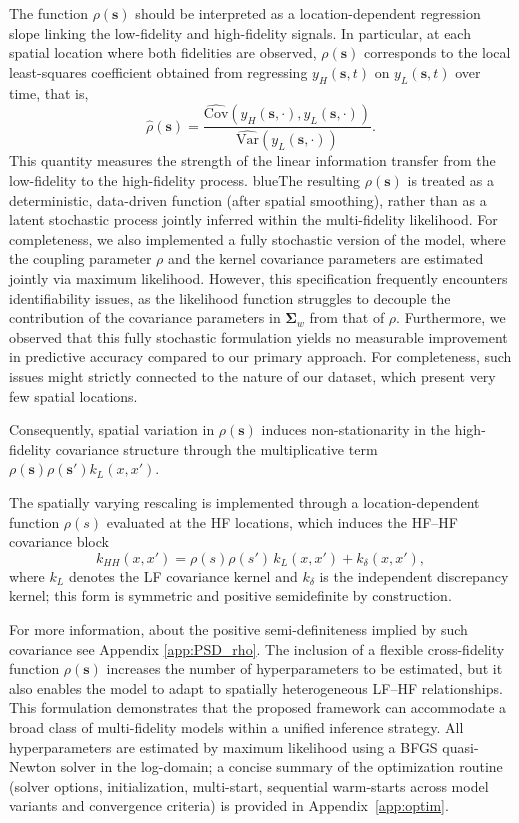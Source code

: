 \documentclass[12pt]{article}
\begin{document}
The function $\rho(\bm{s})$ should be interpreted as a location-dependent
regression slope linking the low-fidelity and high-fidelity signals.
In particular, at each spatial location where both fidelities are observed,
$\rho(\bm{s})$ corresponds to the local least-squares coefficient obtained
from regressing $y_H(\bm{s},t)$ on $y_L(\bm{s},t)$ over time,
that is,
\[
\hat{\rho}(\bm{s}) =
\frac{\widehat{\mathrm{Cov}}\!\left(y_H(\bm{s},\cdot),y_L(\bm{s},\cdot)\right)}
{\widehat{\mathrm{Var}}\!\left(y_L(\bm{s},\cdot)\right)}.
\]
This quantity measures the strength of the linear information transfer
from the low-fidelity to the high-fidelity process.
blueThe resulting $\rho(\bm{s})$ is treated as a deterministic, data-driven
function (after spatial smoothing), rather than as a latent stochastic
process jointly inferred within the multi-fidelity likelihood.  For completeness, we also implemented a fully stochastic version of the model, where the coupling parameter $\rho$ and the kernel covariance parameters are estimated jointly via maximum likelihood. However, this specification frequently encounters identifiability issues, as the likelihood function struggles to decouple the contribution of the covariance parameters in $\boldsymbol{\Sigma}_w$ from that of $\rho$. Furthermore, we observed that this fully stochastic formulation yields no measurable improvement in predictive accuracy compared to our primary approach. For completeness, such issues might strictly connected to the nature of our dataset, which present very few spatial locations.

Consequently, spatial variation in $\rho(\bm{s})$ induces
non-stationarity in the high-fidelity covariance structure through
the multiplicative term $\rho(\bm{s})\rho(\bm{s}')k_L(x,x')$.


The spatially varying rescaling is implemented
through a location-dependent function $\rho(s)$ evaluated at the HF
locations, which induces the HF--HF covariance block
\[
k_{HH}(x,x') = \rho(s)\rho(s')\,k_L(x,x') + k_\delta(x,x'),
\]
where $k_L$ denotes the LF covariance kernel and $k_\delta$ is the
independent discrepancy kernel; this form is symmetric and positive
semidefinite by construction.

For more information, about the positive semi-definiteness implied by such covariance see Appendix \ref{app:PSD_rho}. The inclusion of a flexible cross-fidelity function $\rho(\bm{s})$ increases the number of hyperparameters to be estimated, but it also enables the model to 
adapt to spatially heterogeneous LF–HF relationships. This formulation demonstrates 
that the proposed framework can accommodate a broad class of multi-fidelity models 
within a unified inference strategy. All hyperparameters are estimated by maximum likelihood using a BFGS quasi-Newton solver in the log-domain; a concise summary of the optimization routine (solver options, initialization, multi-start, sequential warm-starts across model variants and convergence criteria) is provided in Appendix~\ref{app:optim}.
\end{document}
